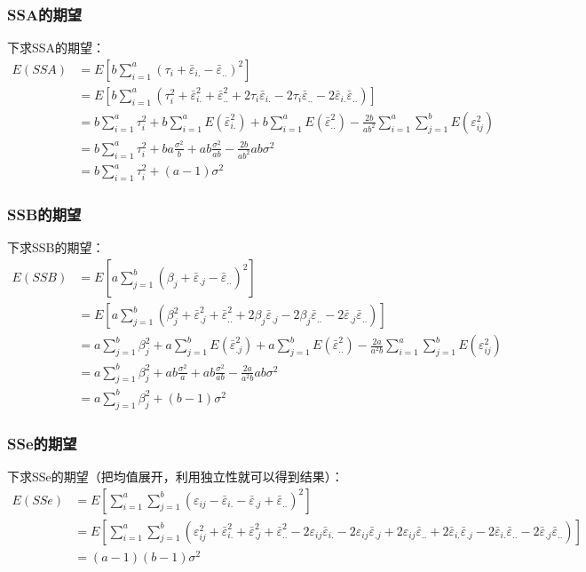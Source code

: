 \subsubsection{SSA的期望}
下求SSA的期望：
\begin{align*}
	E(SSA)
	&=E\left[b\sum_{i=1}^a(\tau_i+\bar{\varepsilon}_{i.}-\bar{\varepsilon}_{..})^2\right] \\
	&=E\left[b\sum_{i=1}^a(\tau_i^2+\bar{\varepsilon}_{i.}^2+\bar{\varepsilon}_{..}^2+2\tau_i\bar{\varepsilon}_{i.}-2\tau_i\bar{\varepsilon}_{..}-2\bar{\varepsilon}_{i.}\bar{\varepsilon}_{..})\right] \\
	&=b\sum_{i=1}^a\tau_i^2+b\sum_{i=1}^aE(\bar{\varepsilon}_{i.}^2)+b\sum_{i=1}^aE(\bar{\varepsilon}_{..}^2)-\frac{2b}{ab^2}\sum_{i=1}^a\sum_{j=1}^bE(\varepsilon_{ij}^2) \\
	&=b\sum_{i=1}^a\tau_i^2+ba\frac{\sigma^2}{b}+ab\frac{\sigma^2}{ab}-\frac{2b}{ab^2}ab\sigma^2 \\
	&=b\sum_{i=1}^a\tau_i^2+(a-1)\sigma^2
\end{align*}
\subsubsection{SSB的期望}
下求SSB的期望：
\begin{align*}
	E(SSB)
	&=E\left[a\sum_{j=1}^b(\beta_j+\bar{\varepsilon}_{.j}-\bar{\varepsilon}_{..})^2\right] \\
	&=E\left[a\sum_{j=1}^b(\beta_j^2+\bar{\varepsilon}_{.j}^2+\bar{\varepsilon}_{..}^2+2\beta_j\bar{\varepsilon}_{.j}-2\beta_j\bar{\varepsilon}_{..}-2\bar{\varepsilon}_{.j}\bar{\varepsilon}_{..})\right] \\
	&=a\sum_{j=1}^b\beta_j^2+a\sum_{j=1}^bE(\bar{\varepsilon}_{.j}^2)+a\sum_{j=1}^bE(\bar{\varepsilon}_{..}^2)-\frac{2a}{a^2b}\sum_{i=1}^a\sum_{j=1}^bE(\varepsilon_{ij}^2) \\
	&=a\sum_{j=1}^b\beta_j^2+ab\frac{\sigma^2}{a}+ab\frac{\sigma^2}{ab}-\frac{2a}{a^2b}ab\sigma^2 \\
	&=a\sum_{j=1}^b\beta_j^2+(b-1)\sigma^2
\end{align*}
\subsubsection{SSe的期望}
下求SSe的期望（把均值展开，利用独立性就可以得到结果）：
\begin{align*}
	E(SSe)
	&=E\left[\sum_{i=1}^a\sum_{j=1}^b(\varepsilon_{ij}-\bar{\varepsilon}_{i.}-\bar{\varepsilon}_{.j}+\bar{\varepsilon}_{..})^2\right] \\
	&=E\left[\sum_{i=1}^a\sum_{j=1}^b(\varepsilon_{ij}^2+\bar{\varepsilon}_{i.}^2+\bar{\varepsilon}_{.j}^2+\bar{\varepsilon}_{..}^2
	-2\varepsilon_{ij}\bar{\varepsilon}_{i.}-2\varepsilon_{ij}\bar{\varepsilon}_{.j}+2\varepsilon_{ij}\bar{\varepsilon}_{..}
	+2\bar{\varepsilon}_{i.}\bar{\varepsilon}_{.j}-2\bar{\varepsilon}_{i.}\bar{\varepsilon}_{..}-2\bar{\varepsilon}_{.j}\bar{\varepsilon}_{..})\right] \\
	&=(a-1)(b-1)\sigma^2
\end{align*}
